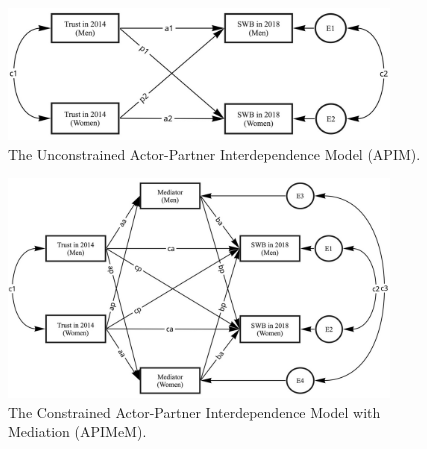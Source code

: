 \begin{figure}[H]
    \centering
    \includegraphics[width=0.9\textwidth]{chapters/chapter4/figures/APIM.jpg}
    \caption{The Unconstrained Actor-Partner Interdependence Model (APIM).}
    \label{fig:APIM}
\end{figure}

\begin{figure}[H]
    \centering
    \includegraphics[width=0.9\textwidth]{chapters/chapter4/figures/APIMeM.jpg}
    \caption{The Constrained Actor-Partner Interdependence Model with Mediation (APIMeM).}
    \label{fig:APIMeM}
\end{figure}
